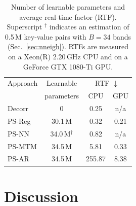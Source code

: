 \documentclass{article}
\makeatletter
\newcommand{\tabsp}{@{\hskip 0.3in}}
\newcommand{\captionspacing}{\vspace{-0.2cm}}
\newcommand{\captionspacing}{}
\makeatother
\begin{document}
\begin{table}[t]
 \begin{center}
 \begin{tabular}{l\tabsp c\tabsp cc}
  \hline\hline
  Approach & Learnable & \multicolumn{2}{c}{RTF $\downarrow$} \\
   & parameters & CPU & GPU \\
  \hline\hline
  Decorr  & 0 & 0.25  & n/a  \\
  PS-Reg   & 30.1\,M & 0.32  & 0.21  \\
  PS-NN   & 34.0\,M$^\dagger$ & 0.82 & n/a  \\
  PS-MTM  & 34.5\,M & 5.81  & 0.33  \\
  PS-AR    & 34.5\,M & 255.87 & 8.38  \\
  \hline\hline
 \end{tabular}
\end{center}
 \captionspacing
 \caption{Number of learnable parameters and average real-time factor (RTF). Superscript $^\dagger$ indicates an estimation of 0.5\,M key-value pairs with $B=34$ bands (Sec.~\ref{sec:nneigh}). RTFs are measured on a Xeon(R) %
 2.20\,GHz CPU and on a GeForce GTX 1080-Ti GPU. }
 \label{tab:parinfer}
\end{table}



\section{Discussion}
\label{sec:discuss}
\end{document}
